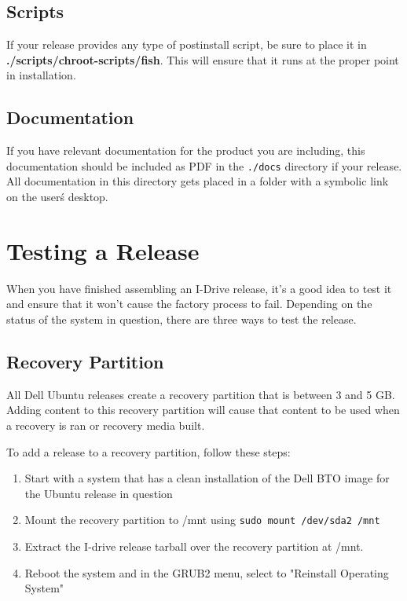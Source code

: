 \documentclass[letterpaper,10pt,titlepage]{article}
\begin{document}
\subsection{Scripts}
If your release provides any type of postinstall script, be sure to place it in \textbf{./scripts/chroot-scripts/fish}.  This will ensure that it runs at the proper point in installation.

\subsection{Documentation}
If you have relevant documentation for the product you are including, this documentation should be included as PDF in the \texttt{./docs} directory if your release.  All documentation in this directory gets placed in a folder with a symbolic link on the user\'s desktop.

\section{Testing a Release}
When you have finished assembling an I-Drive release, it's a good idea to test it and ensure that it won't cause the factory process to fail.  Depending on the status of the system in question, there are three ways to test the release.

\subsection{Recovery Partition}
All Dell Ubuntu releases create a recovery partition that is between 3 and 5 GB.  Adding content to this recovery partition will cause that content to be used when a recovery is ran or recovery media built.

To add a release to a recovery partition, follow these steps:
\begin{enumerate}
\item Start with a system that has a clean installation of the Dell BTO image for the Ubuntu release in question
\item Mount the recovery partition to /mnt using \texttt{sudo mount /dev/sda2 /mnt}
\item Extract the I-drive release tarball over the recovery partition at /mnt.
\item Reboot the system and in the GRUB2 menu, select to "Reinstall Operating System"
\end{enumerate}
\end{document}
